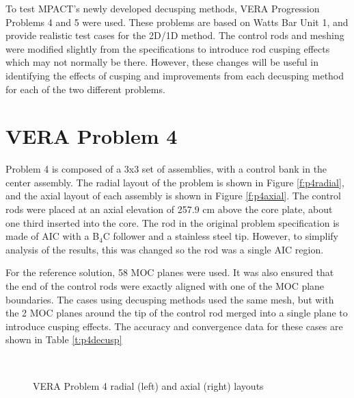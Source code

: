 To test MPACT's newly developed decusping methods, VERA Progression Problems 4 and 5 \cite{VERAProgressionProblems} were used.  These problems are based on Watts Bar Unit 1, and provide realistic test cases for the 2D/1D method.  The control rods and meshing were modified slightly from the specifications to introduce rod cusping effects which may not normally be there.  However, these changes will be useful in identifying the effects of cusping and improvements from each decusping method for each of the two different problems.

\section{VERA Problem 4}

Problem 4 is composed of a 3x3 set of assemblies, with a control bank in the center assembly.  The radial layout of the problem is shown in Figure \ref{f:p4radial}, and the axial layout of each assembly is shown in Figure \ref{f:p4axial}.  The control rods were placed at an axial elevation of 257.9 cm above the core plate, about one third inserted into the core.  The rod in the original problem specification is made of AIC with a B$_4$C follower and a stainless steel tip.  However, to simplify analysis of the results, this was changed so the rod was a single AIC region.

For the reference solution, 58 MOC planes were used.  It was also ensured that the end of the control rods were exactly aligned with one of the MOC plane boundaries.  The cases using decusping methods used the same mesh, but with the 2 MOC planes around the tip of the control rod merged into a single plane to introduce cusping effects.  The accuracy and convergence data for these cases are shown in Table \ref{t:p4decusp}

\begin{figure}[h]\label{f:p4layout}
\centering
{}
~
\caption{VERA Problem 4 radial (left) and axial (right) layouts}\label{f:p4}
\end{figure}

